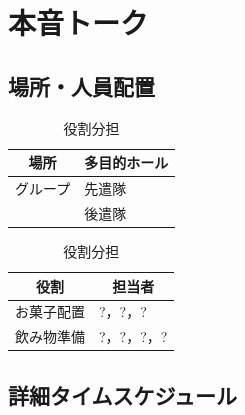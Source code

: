 \newpage

\section{本音トーク}

\subsection{場所・人員配置}
\begin{table}[h]
  \centering
  \begin{minipage}[t]{0.48\columnwidth}
    \centering
    \caption{場所・該当グループ}
    \begin{tabular}{cl}
      \hline
      場所 & 多目的ホール \\
      \hline
      グループ & 先遣隊 \\
       & 後遣隊 \\
      \hline
    \end{tabular}
  \end{minipage}
  \begin{minipage}[t]{0.48\columnwidth}
    \centering
    \caption{役割分担}
    \begin{tabular}{ll}
      \hline
      \multicolumn{1}{c}{役割} & \multicolumn{1}{c}{担当者} \\
      \hline
      お菓子配置 & ?，?，? \\
      飲み物準備 & ?，?，?，? \\
      \hline
    \end{tabular}
  \end{minipage}
\end{table}

\subsection{詳細タイムスケジュール}
\vspace{0.5em}
\fontsize{8pt}{12pt}\selectfont

